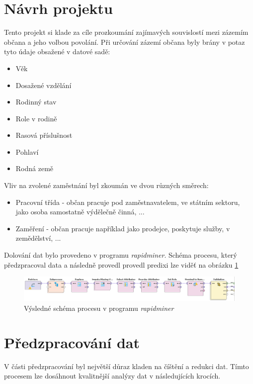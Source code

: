 \documentclass[11pt,a4paper,titlepage]{article}
\begin{document}
    \section{Návrh projektu\label{cile}}
    
    Tento projekt si klade za cíle prozkoumání zajímavých souvislostí mezi zázemím občana a jeho volbou povolání. Při určování zázemí občana byly brány v potaz tyto údaje obsažené v datové sadě:
    
    \begin{itemize}
    	\item Věk
		\item Dosažené vzdělání
		\item Rodinný stav
		\item Role v rodině
		\item Rasová příslušnost
		\item Pohlaví
		\item Rodná země
    \end{itemize}
    
    
	Vliv na zvolené zaměstnání byl zkoumán ve dvou různých směrech:
    \begin{itemize}
        \item Pracovní třída - občan pracuje pod zaměstnavatelem, ve státním sektoru, jako osoba samostatně výdělečně činná, ...
        \item Zaměření - občan pracuje například jako prodejce, poskytuje služby, v zemědělství, ...
    \end{itemize}
    
    Dolování dat bylo provedeno v programu \textit{rapidminer}. Schéma procesu, který předzpracoval data a následně provedl provedl predixi lze viděť na obrázku \ref{proces}
    \begin{figure}[H]
        \label{proces}
        \centering
        \includegraphics[width=1\textwidth]{./img/process.png}
        \caption{Výsledné schéma procesu v programu \textit{rapidminer}}
    \end{figure}

    \section{Předzpracování dat}
        V části předzpracování byl největší důraz kladen na číštění a redukci dat. Tímto procesem lze dosáhnout kvalitnější analýzy dat v následujících krocích. 
        
\end{document}
